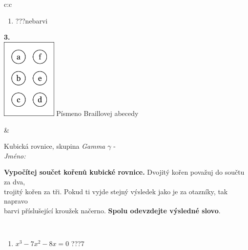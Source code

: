\documentclass[10pt]{report}
\begin{document}
\begin{tabular}{c:c}
\begin{minipage}[c][104.5mm][t]{0.5\linewidth}
\begin{center}
\begin{minipage}{0.79\linewidth}
\begin{center}
\begin{varwidth}{\linewidth}
\begin{enumerate}
\item \quad \dotfill\; ???\;\dotfill \quad nebarvi
\end{enumerate}
\end{varwidth}
\end{center}
\end{minipage}
\begin{minipage}{0.20\linewidth}
\begin{center}
{\Huge\bfseries 3.} \\[2mm]
\includegraphics[height=40mm]{../images/braille.png}
{\small Písmeno Braillovej abecedy}
\end{center}
\end{minipage}
\end{center}
\end{minipage}
&
\begin{minipage}[c][104.5mm][t]{0.5\linewidth}
\begin{center}
\vspace{7mm}
{\huge Kubická rovnice, skupina \textit{Gamma $\gamma$} -}\\[5mm]
\textit{Jméno:}\phantom{xxxxxxxxxxxxxxxxxxxxxxxxxxxxxxxxxxxxxxxxxxxxxxxxxxxxxxxxxxxxxxxxx}\\[5mm]
\begin{minipage}{0.95\linewidth}
\begin{center}
\textbf{Vypočítej součet kořenů kubické rovnice.} Dvojitý kořen považuj do součtu za dva,\\trojitý kořen za tři. Pokud ti vyjde stejný výsledek jako je za otazníky, tak napravo\\barvi příslušející kroužek načerno. \textbf{Spolu odevzdejte výsledné slovo}.
\end{center}
\end{minipage}
\\[1mm]
\begin{minipage}{0.79\linewidth}
\begin{center}
\begin{varwidth}{\linewidth}
\begin{enumerate}
\Large
\item $x^3-7x^2-8x=0$\quad \dotfill\; ???\;\dotfill \quad $7$

\end{enumerate}
\end{varwidth}
\end{center}
\end{minipage}
\end{center}
\end{minipage}
\end{tabular}
\end{document}
